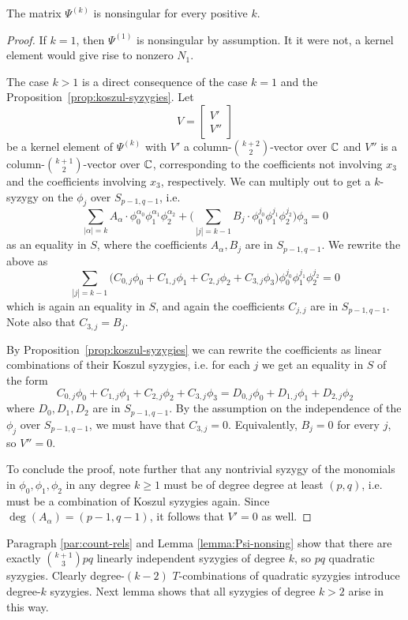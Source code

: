\documentclass[fleqn,reqno]{amsart}
\begin{document}
\begin{lemma}
\label{lemma:Psi-nonsing}
The matrix $\Psi^{(k)}$ is nonsingular for every positive $k$.
\end{lemma}

\begin{proof}
If $k=1$, then $\Psi^{(1)}$ is nonsingular by assumption.
It it were not, a kernel element would give rise to nonzero $N_1$.

The case $k>1$ is a direct consequence of the case $k=1$
and the Proposition~\ref{prop:koszul-syzygies}.
Let
\[
	V=\begin{bmatrix}{V'}\\{V''}\end{bmatrix}
\]
be a kernel element of $\Psi^{(k)}$ with $V'$ a column-$\binom{k+2}{2}$-vector over $\mathbb{C}$
and $V''$ is a column-$\binom{k+1}{2}$-vector over $\mathbb{C}$, corresponding to the coefficients
not involving $x_3$ and the coefficients involving $x_3$, respectively.
We can multiply out to get a $k$-syzygy on the $\phi_j$ over $S_{p-1,q-1}$, i.e.
\[
	\sum_{|\alpha|=k} A_\alpha\cdot
	\phi_0^{\alpha_0}\phi_1^{\alpha_1}\phi_2^{\alpha_2}+
	\big(\sum_{|j|=k-1} B_{j}\cdot
	\phi_0^{j_0}\phi_1^{j_1}\phi_2^{j_2}\big)\phi_3=0
\]
as an equality in $S$, where the coefficients $A_\alpha, B_j$ are in $S_{p-1,q-1}$.
We rewrite the above as
\[
	\sum_{|j|=k-1}\big(
	C_{0,j}\phi_0+C_{1,j}\phi_1+C_{2,j}\phi_2+C_{3,j}\phi_3\big)
	\phi_0^{j_0}\phi_1^{j_1}\phi_2^{j_2}=0
\]
which is again an equality in $S$, and again the coefficients $C_{j,j}$ are in $S_{p-1,q-1}$.
Note also that $C_{3,j}=B_j$.

By Proposition~\ref{prop:koszul-syzygies}
we can rewrite the coefficients as linear combinations of their Koszul syzygies,
i.e. for each $j$ we get an equality in $S$ of the form
\[
	C_{0,j}\phi_0+C_{1,j}\phi_1+C_{2,j}\phi_2+C_{3,j}\phi_3=
	D_{0,j}\phi_0+D_{1,j}\phi_1+D_{2,j}\phi_2
\]
where $D_0,D_1,D_2$ are in $S_{p-1,q-1}$.
By the assumption on the independence of the $\phi_j$ over $S_{p-1,q-1}$,
we must have that $C_{3,j}=0$.
Equivalently, $B_j=0$ for every $j$, so $V''=0$.

To conclude the proof, note further that any nontrivial syzygy
of the monomials in $\phi_0,\phi_1,\phi_2$
in any degree $k\geq1$ must be of degree degree at least $(p,q)$,
i.e. must be a combination of Koszul syzygies again.
Since $\deg(A_\alpha)=(p-1,q-1)$, it follows that $V'=0$ as well.
\end{proof}

\begin{paragraph}
Paragraph \ref{par:count-rels} and Lemma \ref{lemma:Psi-nonsing} show that there are exactly
$\binom{k+1}{3}pq$ linearly independent syzygies of degree $k$, so $pq$ quadratic syzygies.
Clearly degree-$(k-2)$ $T$-combinations of quadratic syzygies introduce degree-$k$ syzygies.
Next lemma shows that all syzygies of degree $k>2$ arise in this way.
\end{paragraph}
\end{document}
